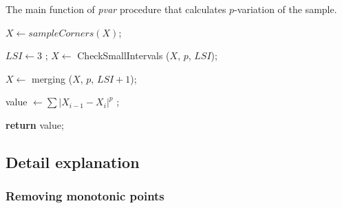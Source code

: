\documentclass[12pt, a4paper]{article}
\numberwithin{equation}{section}
\begin{document}
\begin{algorithm}[H]
\caption{The main function of \emph{pvar} procedure that calculates $p$-variation of the sample.}\label{alg:pvarmain}
\begin{algorithmic}[1]

\State $X \leftarrow sampleCorners(X)$;

\State $LSI \leftarrow 3$ ;
\State $X \leftarrow $ CheckSmallIntervals ($X$,  $p$, $LSI$);

\State $X \leftarrow$ merging ($X$,  $p$, $LSI+1$);

\State value $\leftarrow \sum |X_{i-1}-X_i |^p $ ; 

\State \textbf{return} value;
\EndFunction
\end{algorithmic}
\end{algorithm}


%    
%
%


  
\subsection{Detail explanation}
\label{sec:DetailExplanation}

\subsubsection{Removing monotonic points}
\end{document}
